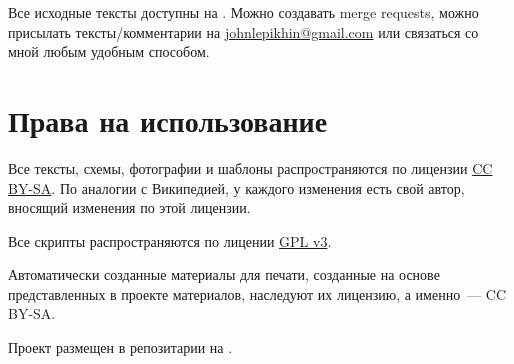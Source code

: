 \documentclass[11pt,fleqn]{report} %
\begin{document}
Все исходные тексты доступны на \gitRepo. Можно создавать merge
requests, можно присылать тексты/комментарии на
\href{mailto:johnlepikhin@gmail.com}{johnlepikhin@gmail.com} или
связаться со мной любым удобным способом.

\section{Права на использование}

Все тексты, схемы, фотографии и шаблоны распространяются по лицензии
\href{https://creativecommons.org/licenses/by-sa/4.0/legalcode.ru}{CC
  BY-SA}. По аналогии с Википедией, у каждого изменения есть свой
автор, вносящий изменения по этой лицензии.

Все скрипты распространяются по лицении
\href{https://www.gnu.org/licenses/quick-guide-gplv3.ru.html}{GPL v3}.

Автоматически созданные материалы для печати, созданные на основе
представленных в проекте материалов, наследуют их лицензию, а
именно~--- CC BY-SA.

Проект размещен в репозитарии на \gitRepo.

\clearpage
 
\printglossary[title={Термины}]
\end{document}
